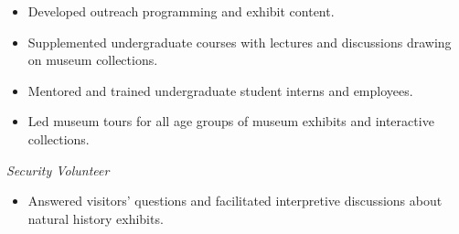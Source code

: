 \begin{itemize}
	\item Developed outreach programming and exhibit content.
	\item Supplemented undergraduate courses with lectures and discussions drawing on museum collections.
	\item Mentored and trained undergraduate student interns and employees.
\end{itemize}

\begin{itemize}
	\item Led museum tours for all age groups of museum exhibits and interactive collections.
\end{itemize}

\textit{Security Volunteer}
\begin{itemize}
	\item Answered visitors' questions and facilitated interpretive discussions about natural history exhibits.
\end{itemize}